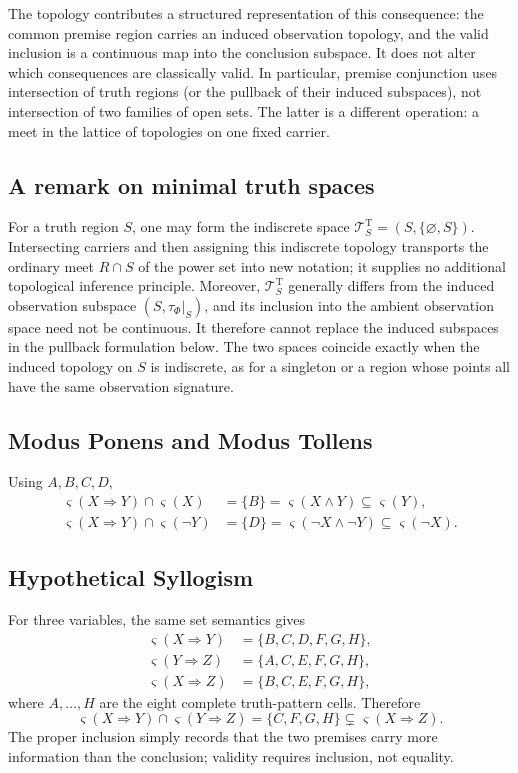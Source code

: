 \documentclass[11pt]{article}
\theoremstyle{definition}
\theoremstyle{plain}
\theoremstyle{remark}
\newcommand{\True}{\mathrm{T}}
\newcommand{\restr}{\mathord{|}}
\begin{document}
The topology contributes a structured representation of this consequence: the
common premise region carries an induced observation topology, and the valid
inclusion is a continuous map into the conclusion subspace.  It does not alter
which consequences are classically valid.  In particular, premise conjunction
uses intersection of truth regions (or the pullback of their induced
subspaces), not intersection of two families of open sets.  The latter is a
different operation: a meet in the lattice of topologies on one fixed carrier.

\subsection{A remark on minimal truth spaces}

For a truth region $S$, one may form the indiscrete space
$\mathcal T^\True_S=(S,\{\varnothing,S\})$.  Intersecting carriers and then
assigning this indiscrete topology transports the ordinary meet
$R\cap S$ of the power set into new notation; it supplies no additional
topological inference principle.  Moreover, $\mathcal T^\True_S$ generally
differs from the induced observation subspace
$(S,\tau_\Phi\restr_S)$, and its inclusion into the ambient observation space
need not be continuous.  It therefore cannot replace the induced subspaces in
the pullback formulation below.  The two spaces coincide exactly when the
induced topology on $S$ is indiscrete, as for a singleton or a region whose
points all have the same observation signature.

\subsection{Modus Ponens and Modus Tollens}

Using $A,B,C,D$,
\begin{align*}
 \varsigma(X\Rightarrow Y)\cap\varsigma(X)
   &=\{B\}
    =\varsigma(X\wedge Y)
    \subseteq\varsigma(Y),\\
 \varsigma(X\Rightarrow Y)\cap\varsigma(\neg Y)
   &=\{D\}
    =\varsigma(\neg X\wedge\neg Y)
    \subseteq\varsigma(\neg X).
\end{align*}
\subsection{Hypothetical Syllogism}

For three variables, the same set semantics gives
\begin{align*}
 \varsigma(X\Rightarrow Y)&=\{B,C,D,F,G,H\},\\
 \varsigma(Y\Rightarrow Z)&=\{A,C,E,F,G,H\},\\
 \varsigma(X\Rightarrow Z)&=\{B,C,E,F,G,H\},
\end{align*}
where $A,\ldots,H$ are the eight complete truth-pattern cells.  Therefore
\[
 \varsigma(X\Rightarrow Y)\cap\varsigma(Y\Rightarrow Z)
 =\{C,F,G,H\}
 \subsetneq\varsigma(X\Rightarrow Z).
\]
The proper inclusion simply records that the two premises carry more
information than the conclusion; validity requires inclusion, not equality.
\end{document}
